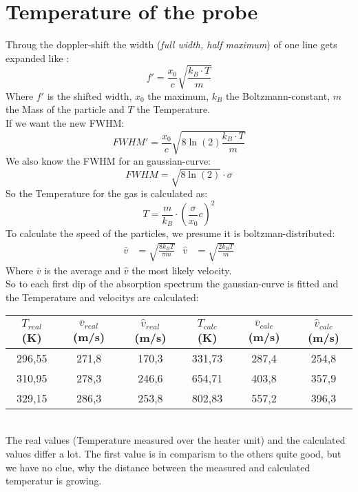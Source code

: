 \section{Temperature of the probe}
Throug the doppler-shift the width (\textit{full width, half maximum}) of one line gets expanded like \citep[][]{Wiki-Dopp}:
\begin{equation}
    f'=\frac{x_0}{c}\sqrt{\frac{k_B\cdot T}{m}}
\end{equation}
Where $f'$ is the shifted width, $x_0$ the maximum, $k_B$ the Boltzmann-constant, $m$ the Mass of the particle and $T$ the Temperature.\\
If we want the new FWHM:
\begin{equation}
    FWHM'=\frac{x_0}{c}\sqrt{8\ln(2)\frac{k_B\cdot T}{m}}
\end{equation}
We also know the FWHM for an gaussian-curve:
\begin{equation}
    FWHM=\sqrt{8\ln(2)}\cdot\sigma
\end{equation}
So the Temperature for the gas is calculated as:
\begin{equation}
    T=\frac{m}{k_B}\cdot\left(\frac{\sigma}{x_0}c\right)^2
\end{equation}
To calculate the speed of the particles, we presume it is boltzman-distributed:
\begin{align}
    \bar{v}&=\sqrt{\frac{8k_BT}{\pi m}}&\hat{v}&=\sqrt{\frac{2k_BT}{m}}
\end{align}
Where $\bar{v}$ is the average and $\hat{v}$ the most likely velocity.\\

So to each first dip of the absorption spectrum the gaussian-curve is fitted and the Temperature and velocitys are calculated:
\begin{table}[h]
    \centering\begin{tabular}{c||cc|ccc}
        $T_{real}$ (K)& $\bar{v}_{real}$ (m/s)& $\hat{v}_{real}$ (m/s)& $T_{calc}$ (K)& $\bar{v}_{calc}$ (m/s)& $\hat{v}_{calc}$(m/s)\\\hline
        296,55&271,8&170,3&331,73&287,4&254,8\\
        310,95&278,3&246,6&654,71&403,8&357,9\\
        329,15&286,3&253,8&802,83&557,2&396,3\\
    \end{tabular}
\end{table}\\
The real values (Temperature measured over the heater unit) and the calculated values differ a lot.
The first value is in comparism to the others quite good, but we have no clue, why the distance between the measured and calculated temperatur is growing.